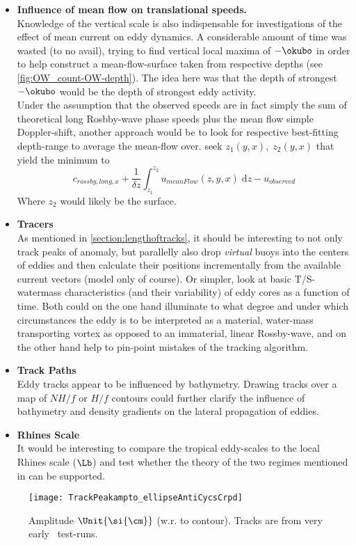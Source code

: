 \begin{itemize}
\item
\textbf{Influence of mean flow on translational speeds.}\\
Knowledge of the vertical scale is also indispensable for investigations of the effect of mean current on eddy dynamics. A considerable amount of time was wasted (to no avail), trying to find vertical local maxima of $-\okubo$ in order to help construct a mean-flow-surface taken from respective depths (see \cref{fig:OW_count-OW-depth}).
The idea here was that the depth of strongest $-\okubo$ would be the depth of strongest eddy activity.\\
Under the assumption that the observed speeds are in fact simply the sum of theoretical long Rosbby-wave phase speeds plus the mean flow \ie simple Doppler-shift, another approach would be to look for respective best-fitting depth-range to average the mean-flow over. \Ie seek $z_{1}(y,x),\; z_{2}(y,x)$ that yield the minimum to
\begin{equation}
c_{rossby,long,x}
+
\frac{1}{\delta z} \int_{z_{1}}^{z_{2}} u_{meanFlow}(z,y,x) \; \mathrm{d}z
-
u_{observed}
\end{equation}
Where $z_{2}$ would likely be the surface.
\item
\textbf{Tracers}\\
As mentioned in \ref{section:lengthoftracks}, it should be interesting to not only track peaks of \SSH anomaly, but parallelly also \eg drop \textit{virtual}  buoys into the centers of eddies and then calculate their positions incrementally from the available current vectors (model only of course). Or simpler, look at basic T/S-watermass characteristics (and their variability) of eddy cores as a function of time. Both could on the one hand illuminate to what degree and under which circumstances the eddy is to be interpreted as a material, water-mass transporting vortex as opposed to an immaterial, linear Rossby-wave, and on the other hand help to pin-point mistakes of the tracking algorithm.

\item
\textbf{Track Paths}\\
Eddy tracks appear to be influenced by bathymetry. Drawing tracks over a map of \eg $N H/f$ or $H/f$ contours could further clarify the influence of bathymetry and density gradients on the lateral propagation of eddies.


\item
\textbf{Rhines Scale}\\
It would be interesting to compare the tropical eddy-scales to the local Rhines scale ($\Lb$) and test whether the theory of the two regimes mentioned in \citep{Eden2007} can be supported.

\end{itemize}




\begin{figure*}
\texttt{[image: TrackPeakampto\_ellipseAntiCycsCrpd]}
\caption{Amplitude $\Unit{\si{\cm}}$ (w.r. to contour). Tracks are from very early \POP~test-runs.}
\label{fig:TrackPeakampto_ellipseAntiCycsCrpd}
\end{figure*}
